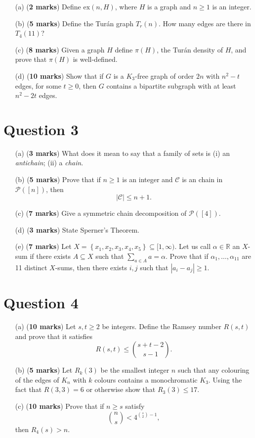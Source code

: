 \documentclass[11pt]{article}
\begin{document}
\begin{enumerate}
    \item[(a)] (\textbf{2 marks}) Define $\text{ex}(n, H)$, where $H$ is a graph and $n \geqslant 1$ is an integer.
    \item[(b)] (\textbf{5 marks}) Define the Turán graph $T_r(n)$. How many edges are there in $T_4(11)$?
    \item[(c)] (\textbf{8 marks}) Given a graph $H$ define $\pi(H)$, the Turán density of $H$, and prove that $\pi(H)$ is well-defined.
    \item[(d)] (\textbf{10 marks}) Show that if $G$ is a $K_3$-free graph of order $2n$ with $ n^2 -t$ edges, for some $t \geqslant 0$, then $G$ contains a bipartite subgraph with at least $n^2-2 t$ edges.
\end{enumerate}

\section*{Question 3}

\begin{enumerate}
    \item[(a)] (\textbf{3 marks}) What does it mean to say that a family of sets is (i) an \textit{antichain}; (ii) a \textit{chain}.
    \item[(b)] (\textbf{5 marks}) Prove that if $n \geqslant 1$ is an integer and $\mathcal{C}$ is an chain in $\mathcal{P}([n])$, then
    \[
    |\mathcal{C}| \leqslant
    n+1
    .
    \]
    \item[(c)] (\textbf{7 marks}) Give a symmetric chain decomposition of $\mathcal{P}([4])$.
    \item[(d)] (\textbf{3 marks}) State Sperner's Theorem.
    \item[(e)] (\textbf{7 marks}) Let $X=\left\{x_1, x_2, x_3, x_4, x_5\right\} \subseteq [1, \infty)$. Let us call $\alpha \in \mathbb{R}$ an $X$-sum if there exists $A \subseteq X$ such that $\sum_{a \in A} a= \alpha$. Prove that if $\alpha_1, \ldots, \alpha_{11}$ are 11 distinct $X$-sums, then there exists $i, j$ such that $\left|a_i-a_j\right| \geqslant 1$. 
\end{enumerate}


\section*{Question 4}

\begin{enumerate}
    \item[(a)] (\textbf{10 marks}) Let $s, t \geqslant 2$ be integers. Define the Ramsey number $R(s, t)$ and prove that it satisfies
    \[
    R(s, t) \leqslant 
    {s+t-2 \choose
    s-1}
    .
    \]
    \item[(b)] (\textbf{5 marks}) Let $R_k(3)$ be the smallest integer $n$ such that any colouring of the edges of $K_n$ with $k$ colours contains a monochromatic $K_3$. Using the fact that $R(3,3)=6$ or otherwise show that $R_3(3) \leqslant 17$.
    \item[(c)] (\textbf{10 marks}) Prove that if $n \geqslant s$ satisfy
    \[
    {n \choose s} < 4^{{s \choose 2} - 1},
    \]
    then $R_4(s)>n$.
\end{enumerate}
\end{document}
